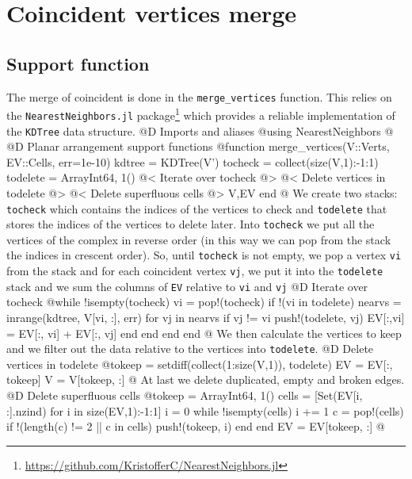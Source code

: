\documentclass[10pt,oneside]{article}
\begin{document}
\section{Coincident vertices merge}
\subsection{Support function}
\label{sec:merge_vertices}
The merge of coincident is done in the \texttt{merge\_vertices}
function. This relies on the \texttt{NearestNeighbors.jl}
package\footnote{\url{https://github.com/KristofferC/NearestNeighbors.jl}}
which provides a reliable implementation of the \texttt{KDTree} data structure.
@D Imports and aliases
@{using NearestNeighbors
@}
@D Planar arrangement support functions
@{function merge_vertices(V::Verts, EV::Cells, err=1e-10)
    kdtree = KDTree(V')
    tocheck = collect(size(V,1):-1:1)
    todelete = Array{Int64, 1}()
    @< Iterate over tocheck @>
    @< Delete vertices in todelete @>
    @< Delete superfluous cells @>
    V,EV
end
@}
We create two stacks: \texttt{tocheck} which contains the indices of the vertices
to check and \texttt{todelete} that stores the indices of the vertices to delete later.
Into \texttt{tocheck} we put all the vertices of the complex in reverse order (in
this way we can pop from the stack the indices in crescent order). So, until \texttt{tocheck} is not empty,
we pop a vertex \texttt{vi} from the stack and for each coincident vertex \texttt{vj}, we put it 
into the \texttt{todelete} stack and we sum the columns of \texttt{EV} relative to \texttt{vi} and \texttt{vj}
@D Iterate over tocheck 
@{while !isempty(tocheck)
    vi = pop!(tocheck)
    if !(vi in todelete)
        nearvs = inrange(kdtree, V[vi, :], err)
        for vj in nearvs
            if vj != vi
                push!(todelete, vj)
                EV[:,vi] = EV[:, vi] + EV[:, vj]
            end
        end
    end
end
@}
We then calculate the vertices to keep and we filter out
the data relative to the vertices into \texttt{todelete}.
@D Delete vertices in todelete
@{tokeep = setdiff(collect(1:size(V,1)), todelete)
EV = EV[:, tokeep]
V = V[tokeep, :]
@}
At last we delete duplicated, empty and broken edges.
@D Delete superfluous cells
@{tokeep = Array{Int64, 1}()
cells = [Set(EV[i, :].nzind) for i in size(EV,1):-1:1]
i = 0
while !isempty(cells)
    i += 1
    c = pop!(cells)
    if !(length(c) != 2 || c in cells)
        push!(tokeep, i)
    end
end
EV = EV[tokeep, :]
@}
\end{document}
